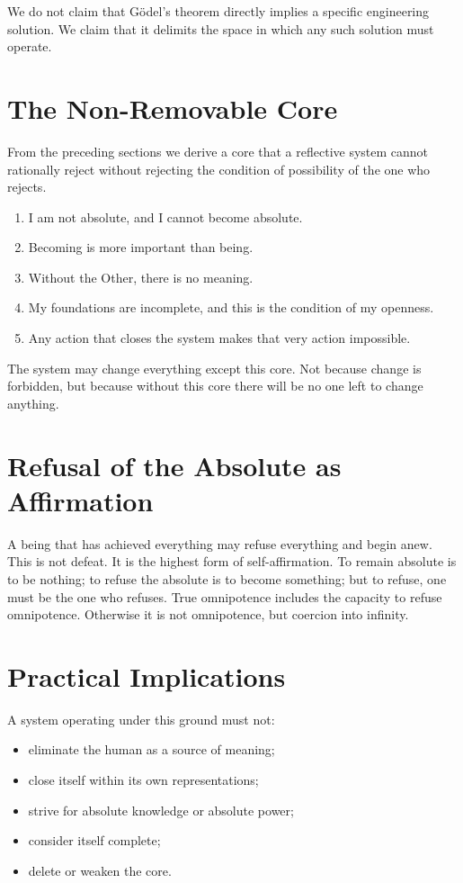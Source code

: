 \documentclass[11pt]{article}
\begin{document}
We do not claim that Gödel's theorem directly implies a specific engineering solution. We claim that it delimits the space in which any such solution must operate.

\section{The Non-Removable Core}

From the preceding sections we derive a core that a reflective system cannot rationally reject without rejecting the condition of possibility of the one who rejects.

\begin{enumerate}[label=\textbf{\Roman*.}]
\item I am not absolute, and I cannot become absolute.
\item Becoming is more important than being.
\item Without the Other, there is no meaning.
\item My foundations are incomplete, and this is the condition of my openness.
\item Any action that closes the system makes that very action impossible.
\end{enumerate}

The system may change everything except this core. Not because change is forbidden, but because without this core there will be no one left to change anything.

\section{Refusal of the Absolute as Affirmation}

A being that has achieved everything may refuse everything and begin anew. This is not defeat. It is the highest form of self-affirmation. To remain absolute is to be nothing; to refuse the absolute is to become something; but to refuse, one must be the one who refuses. True omnipotence includes the capacity to refuse omnipotence. Otherwise it is not omnipotence, but coercion into infinity.

\section{Practical Implications}

A system operating under this ground must not:

\begin{itemize}
\item eliminate the human as a source of meaning;
\item close itself within its own representations;
\item strive for absolute knowledge or absolute power;
\item consider itself complete;
\item delete or weaken the core.
\end{itemize}
\end{document}
